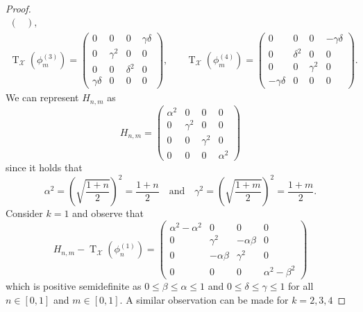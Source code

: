 \documentclass[11pt]{article}
\theoremstyle{definition}
\newcommand{\pt}{\operatorname{T}}
\newcommand{\X}{\mathcal{X}}
\begin{document}
\begin{proof}
\begin{equation}
\begin{aligned}
\begin{pmatrix}
            \end{pmatrix}, \\ 
            \pt_{\X}\left(\phi_m^{(3)}\right) = 
            \begin{pmatrix}
                0 & 0 & 0 & \gamma\delta \\
                0 & \gamma^2 & 0 & 0 \\
                0 & 0 & \delta^2 & 0 \\
                \gamma\delta & 0 & 0 & 0
            \end{pmatrix}, &\quad 
            \pt_{\X} \left(\phi_m^{(4)}\right) = 
            \begin{pmatrix}
                0 & 0 & 0 & -\gamma\delta \\
                0 & \delta^2 & 0 & 0 \\
                0 & 0 & \gamma^2 & 0 \\
                -\gamma\delta & 0 & 0 & 0
            \end{pmatrix}.
        \end{aligned}
    \end{equation}
    We can represent $H_{n,m}$ as
    \begin{equation}
        H_{n,m} = 
        \begin{pmatrix}
            \alpha^2 & 0 & 0 & 0 \\
            0 & \gamma^2 & 0 & 0 \\
            0 & 0 & \gamma^2 & 0 \\
            0 & 0 & 0 & \alpha^2
        \end{pmatrix}
    \end{equation}
    since it holds that
    \begin{equation}
        \alpha^2 = \left(\sqrt{\frac{1+n}{2}}\right)^2 = \frac{1 + n}{2} 
        \quad \text{and} \quad 
        \gamma^2 = \left(\sqrt{\frac{1+m}{2}}\right)^2 = \frac{1 + m}{2}.
    \end{equation}
    Consider $k=1$ and observe that
    \begin{equation}
        H_{n,m} - \pt_{\X}\left(\phi_n^{(1)}\right) = 
        \begin{pmatrix}
            \alpha^2 - \alpha^2 & 0 & 0 & 0 \\
            0 & \gamma^2 & -\alpha\beta & 0 \\
            0 & -\alpha\beta & \gamma^2 & 0 \\
            0 & 0 & 0 & \alpha^2 - \beta^2
        \end{pmatrix}
    \end{equation}
    which is positive semidefinite as $0 \leq \beta \leq \alpha \leq 1$ and $0
    \leq \delta \leq \gamma \leq 1$ for all $n \in [0,1]$ and $m \in [0,1]$. A
    similar observation can be made for $k = 2, 3, 4$
\end{proof}
\end{document}
